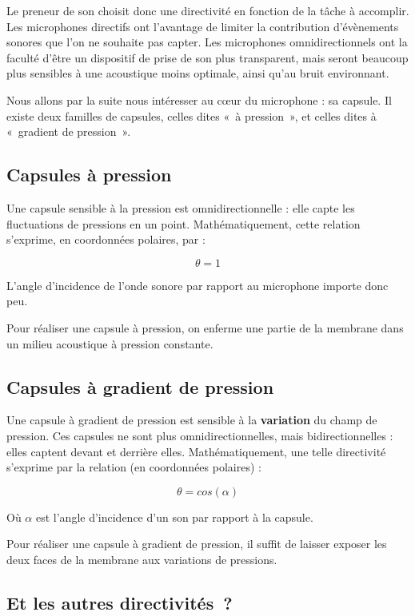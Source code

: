 \documentclass[
  letterpaper,
  DIV=11,
  numbers=noendperiod]{scrreprt}
\begin{document}
Le preneur de son choisit donc une directivité en fonction de la tâche à
accomplir. Les microphones directifs ont l'avantage de limiter la
contribution d'évènements sonores que l'on ne souhaite pas capter. Les
microphones omnidirectionnels ont la faculté d'être un dispositif de
prise de son plus transparent, mais seront beaucoup plus sensibles à une
acoustique moins optimale, ainsi qu'au bruit environnant.

Nous allons par la suite nous intéresser au cœur du microphone : sa
capsule. Il existe deux familles de capsules, celles dites «~à
pression~», et celles dites à «~gradient de pression~».

\hypertarget{capsules-uxe0-pression}{%
\subsection{Capsules à pression}\label{capsules-uxe0-pression}}

Une capsule sensible à la pression est omnidirectionnelle : elle capte
les fluctuations de pressions en un point. Mathématiquement, cette
relation s'exprime, en coordonnées polaires, par :

\[ \theta = 1 \]

L'angle d'incidence de l'onde sonore par rapport au microphone importe
donc peu.

Pour réaliser une capsule à pression, on enferme une partie de la
membrane dans un milieu acoustique à pression constante.

\hypertarget{capsules-uxe0-gradient-de-pression}{%
\subsection{Capsules à gradient de
pression}\label{capsules-uxe0-gradient-de-pression}}

Une capsule à gradient de pression est sensible à la \textbf{variation}
du champ de pression. Ces capsules ne sont plus omnidirectionnelles,
mais bidirectionnelles : elles captent devant et derrière elles.
Mathématiquement, une telle directivité s'exprime par la relation (en
coordonnées polaires) :

\[ \theta = cos(\alpha) \]

Où \(\alpha\) est l'angle d'incidence d'un son par rapport à la capsule.

Pour réaliser une capsule à gradient de pression, il suffit de laisser
exposer les deux faces de la membrane aux variations de pressions.

\hypertarget{et-les-autres-directivituxe9s}{%
\subsection{Et les autres
directivités~?}\label{et-les-autres-directivituxe9s}}
\end{document}
